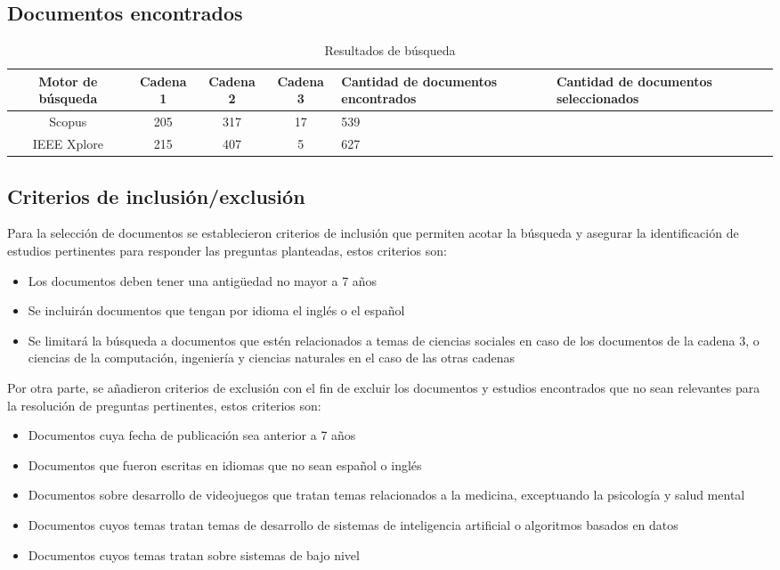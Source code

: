 \subsection{Documentos encontrados}

\begin{table}[H]
    \centering
    \begin{tabularx}{\textwidth}{|c|c|c|c|X|X|}
        \hline
        Motor de búsqueda  & Cadena 1 & Cadena 2 & Cadena 3 & Cantidad de documentos encontrados & Cantidad de documentos seleccionados \\ \hline
        Scopus & 205 & 317 & 17 & 539 & \\ \hline
        IEEE Xplore & 215 & 407 & 5 & 627 & \\ \hline
    \end{tabularx}
    \caption{Resultados de búsqueda}
    \label{tab:placeholder}
\end{table}

\subsection{Criterios de inclusión/exclusión}

Para la selección de documentos se establecieron criterios de inclusión que permiten acotar la búsqueda y asegurar la identificación de estudios pertinentes para responder las preguntas planteadas, estos criterios son:

\begin{itemize}
    \item Los documentos deben tener una antigüedad no mayor a 7 años
    \item Se incluirán documentos que tengan por idioma el inglés o el español
    \item Se limitará la búsqueda a documentos que estén relacionados a temas de ciencias sociales en caso de los documentos de la cadena 3, o ciencias de la computación, ingeniería y ciencias naturales en el caso de las otras cadenas
\end{itemize}

Por otra parte, se añadieron criterios de exclusión con el fin de excluir los documentos y estudios encontrados que no sean relevantes para la resolución de preguntas pertinentes, estos criterios son:

\begin{itemize}
    \item Documentos cuya fecha de publicación sea anterior a 7 años
    \item Documentos que fueron escritas en idiomas que no sean español o inglés
    \item Documentos sobre desarrollo de videojuegos que tratan temas relacionados a la medicina, exceptuando la psicología y salud mental
    \item Documentos cuyos temas tratan temas de desarrollo de sistemas de inteligencia artificial o algoritmos basados en datos
    \item Documentos cuyos temas tratan sobre sistemas de bajo nivel
\end{itemize}

